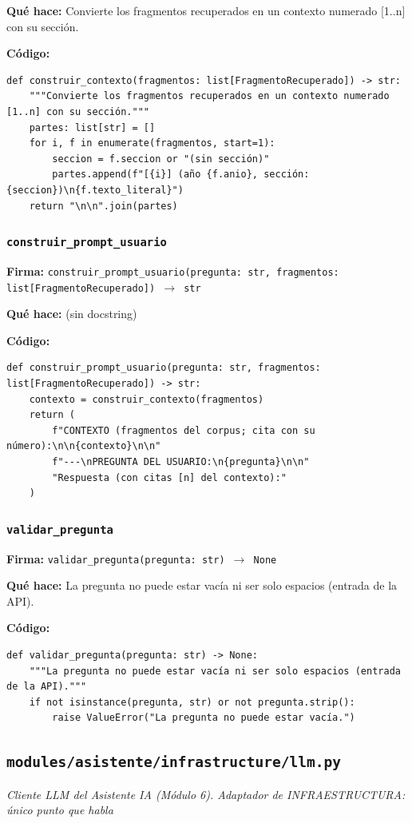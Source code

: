\documentclass[11pt,a4paper]{article}
\begin{document}
\textbf{Qué hace:} Convierte los fragmentos recuperados en un contexto numerado [1..n] con su sección.

\textbf{Código:}
\begin{lstlisting}
def construir_contexto(fragmentos: list[FragmentoRecuperado]) -> str:
    """Convierte los fragmentos recuperados en un contexto numerado [1..n] con su sección."""
    partes: list[str] = []
    for i, f in enumerate(fragmentos, start=1):
        seccion = f.seccion or "(sin sección)"
        partes.append(f"[{i}] (año {f.anio}, sección: {seccion})\n{f.texto_literal}")
    return "\n\n".join(partes)
\end{lstlisting}

\subsubsection*{\texttt{construir\_prompt\_usuario}}
\textbf{Firma:} \texttt{construir\_prompt\_usuario(pregunta: str, fragmentos: list[FragmentoRecuperado]) $\rightarrow$ str}

\textbf{Qué hace:} (sin docstring)

\textbf{Código:}
\begin{lstlisting}
def construir_prompt_usuario(pregunta: str, fragmentos: list[FragmentoRecuperado]) -> str:
    contexto = construir_contexto(fragmentos)
    return (
        f"CONTEXTO (fragmentos del corpus; cita con su número):\n\n{contexto}\n\n"
        f"---\nPREGUNTA DEL USUARIO:\n{pregunta}\n\n"
        "Respuesta (con citas [n] del contexto):"
    )
\end{lstlisting}

\subsubsection*{\texttt{validar\_pregunta}}
\textbf{Firma:} \texttt{validar\_pregunta(pregunta: str) $\rightarrow$ None}

\textbf{Qué hace:} La pregunta no puede estar vacía ni ser solo espacios (entrada de la API).

\textbf{Código:}
\begin{lstlisting}
def validar_pregunta(pregunta: str) -> None:
    """La pregunta no puede estar vacía ni ser solo espacios (entrada de la API)."""
    if not isinstance(pregunta, str) or not pregunta.strip():
        raise ValueError("La pregunta no puede estar vacía.")
\end{lstlisting}

\subsection{\texttt{modules/asistente/infrastructure/llm.py}}
\textit{Cliente LLM del Asistente IA (Módulo 6). Adaptador de INFRAESTRUCTURA: único punto que habla}
\end{document}
